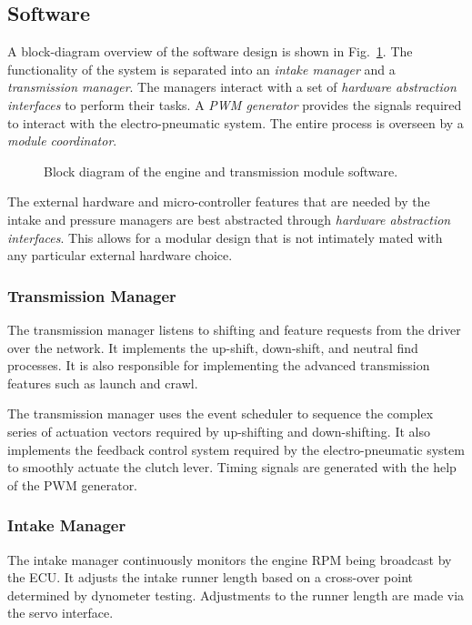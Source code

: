 \subsection{Software}

A block-diagram overview of the software design is shown in Fig.\ \ref{fig:engine_software_design_block}. The functionality of the system is separated into an \emph{intake manager} and a \emph{transmission manager}. The managers interact with a set of \emph{hardware abstraction interfaces} to perform their tasks. A \emph{PWM generator} provides the signals required to interact with the electro-pneumatic system. The entire process is overseen by a \emph{module coordinator}.

\begin{figure}[H]
	\centering
	
	\caption{Block diagram of the engine and transmission module software.}
	\label{fig:engine_software_design_block}
\end{figure}

The external hardware and micro-controller features that are needed by the intake and pressure managers are best abstracted through \emph{hardware abstraction interfaces}. This allows for a modular design that is not intimately mated with any particular external hardware choice. 

\subsubsection{Transmission Manager}

The transmission manager listens to shifting and feature requests from the driver over the network. It implements the up-shift, down-shift, and neutral find processes. It is also responsible for implementing the advanced transmission features such as launch and crawl.

The transmission manager uses the event scheduler to sequence the complex series of actuation vectors required by up-shifting and down-shifting. It also implements the feedback control system required by the electro-pneumatic system to smoothly actuate the clutch lever. Timing signals are generated with the help of the PWM generator.

\subsubsection{Intake Manager}

The intake manager continuously monitors the engine RPM being broadcast by the ECU. It adjusts the intake runner length based on a cross-over point determined by dynometer testing. Adjustments to the runner length are made via the servo interface.

